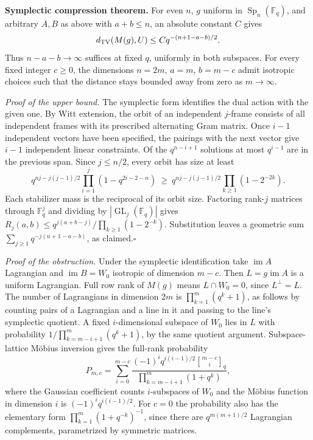 \medskip\noindent\textbf{Symplectic compression theorem.}
For even $n$, $g$ uniform in $\operatorname{Sp}_n(\mathbb F_q)$, and arbitrary $A,B$ as above with $a+b\le n$, an absolute constant $C$ gives
\[
 d_{\rm TV}(M(g),U)\le C q^{-(n+1-a-b)/2}.
\]
Thus $n-a-b\to\infty$ suffices at fixed $q$, uniformly in both subspaces. For every fixed integer $c\ge0$, the dimensions $n=2m$, $a=m$, $b=m-c$ admit isotropic choices such that the distance stays bounded away from zero as $m\to\infty$.

\emph{Proof of the upper bound.}
The symplectic form identifies the dual action with the given one. By Witt extension, the orbit of an independent $j$-frame consists of all independent frames with its prescribed alternating Gram matrix. Once $i-1$ independent vectors have been specified, the pairings with the next vector give $i-1$ independent linear constraints. Of the $q^{n-i+1}$ solutions at most $q^{i-1}$ are in the previous span. Since $j\le n/2$, every orbit has size at least
\[
 q^{nj-j(j-1)/2}\prod_{i=1}^j(1-q^{2i-2-n})
 \ \ge\ q^{nj-j(j-1)/2}\prod_{k\ge1}(1-2^{-2k}).
\]
Each stabilizer mass is the reciprocal of its orbit size. Factoring rank-$j$ matrices through $\mathbb F_q^j$ and dividing by $|\operatorname{GL}_j(\mathbb F_q)|$ gives
$R_j(a,b)\le q^{j(a+b-j)}/\prod_{k\ge1}(1-2^{-k})$.
Substitution leaves a geometric sum $\sum_{j\ge1}q^{-j(n+1-a-b)}$, as claimed.\hfill$\square$

\emph{Proof of the obstruction.}
Under the symplectic identification take $\operatorname{im}A$ Lagrangian and $\operatorname{im}B=W_0$ isotropic of dimension $m-c$. Then $L=g\operatorname{im}A$ is a uniform Lagrangian. Full row rank of $M(g)$ means $L\cap W_0=0$, since $L^\perp=L$. The number of Lagrangians in dimension $2m$ is $\prod_{k=1}^m(q^k+1)$, as follows by counting pairs of a Lagrangian and a line in it and passing to the line's symplectic quotient. A fixed $i$-dimensional subspace of $W_0$ lies in $L$ with probability $1/\prod_{k=m-i+1}^{m}(q^k+1)$, by the same quotient argument. Subspace-lattice M\"obius inversion gives the full-rank probability
\[
 P_{m,c}=\sum_{i=0}^{m-c}
  \frac{(-1)^i q^{i(i-1)/2}\genfrac{[}{]}{0pt}{}{m-c}{i}_{q}}
       {\prod_{k=m-i+1}^{m}(1+q^k)},
\]
where the Gaussian coefficient counts $i$-subspaces of $W_0$ and the M\"obius function in dimension $i$ is $(-1)^i q^{i(i-1)/2}$. For $c=0$ the probability also has the elementary form $\prod_{k=1}^m(1+q^{-k})^{-1}$, since there are $q^{m(m+1)/2}$ Lagrangian complements, parametrized by symmetric matrices.

